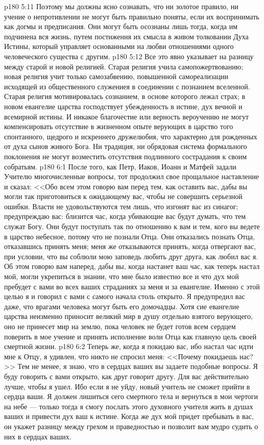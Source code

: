 \vs p180 5:11 Поэтому мы должны ясно сознавать, что ни золотое правило, ни учение о непротивлении не могут быть правильно поняты, если их воспринимать как догмы и предписания. Они могут быть осознаны лишь тогда, когда им подчинена вся жизнь, путем постижения их смысла в живом толковании Духа Истины, который управляет основанными на любви отношениями одного человеческого существа с другим.
\vs p180 5:12 Все это явно указывает на разницу между старой и новой религией. Старая религия учила самопожертвованию; новая религия учит только самозабвению, повышенной самореализации исходящей из общественного служениея в соединении с познанием вселенной. Старая религия мотивировалась сознанием, в основе которого лежал страх; в новом евангелие царства господствует убежденность в истине, дух вечной и всемирной истины. И никакое благочестие или верность вероучению не могут компенсировать отсутствие в жизненном опыте верующих в царство того спонтанного, щедрого и искреннего дружелюбия, что характерно для рожденных от духа сынов живого Бога. Ни традиция, ни обрядовая система формального поклонения не могут возместить отсутствия подлинного сострадания к своим собратьям.
\vs p180 6:1 После того, как Петр, Иаков, Иоанн и Матфей задали Учителю многочисленные вопросы, тот продолжил свое прощальное наставление и сказал: <<Обо всем этом говорю вам перед тем, как оставить вас, дабы вы могли так приготовиться к ожидающему вас, чтобы не совершить серьезной ошибки. Власти не удовольствуются тем лишь, что изгонят вас из синагог; предупреждаю вас: близится час, когда убивающие вас будут думать, что тем служат Богу. Они будут поступать так по отношению к вам и тем, кого вы ведете в царство небесное, потому что не познали Отца. Они отказались познать Отца, отказавшись принять меня; меня же отказываются принять, когда отвергают вас, при условии, что вы соблюли мою заповедь любить друг друга, как любил вас я. Об этом говорю вам наперед, дабы вы, когда настанет ваш час, как теперь настал мой, могли укрепиться в знании, что мне было известно все и что дух мой пребудет с вами во всех ваших страданиях за меня и за евангелие. Именно с этой целью я и говорил с вами с самого начала столь открыто. Я предупредил вас даже, что врагами человека могут быть его домочадцы. Хотя сие евангелие царства неизменно приносит великий мир в душу отдельно взятого верующего, оно не принесет мир на землю, пока человек не будет готов всем сердцем поверить в мое учение и принять исполнение воли Отца как главную цель своей смертной жизни.
\vs p180 6:2 Теперь же, когда я покидаю вас, ибо настал час идти мне к Отцу, я удивлен, что никто не спросил меня: <<Почему покидаешь нас?>> Тем не менее, я знаю, что в сердцах ваших вы задаете подобные вопросы. Я буду говорить с вами открыто, как друг говорит другу. Для вас действительно лучше, чтобы я ушел. Ибо если я не уйду, новый учитель не сможет прийти в сердца ваши. Я должен лишиться сего смертного тела и вернуться в мои чертоги на небе --- только тогда я смогу послать этого духовного учителя жить в душах ваших и привести дух ваш к истине. Когда же дух мой придет пребывать в вас, он укажет разницу между грехом и праведностью и позволит вам мудро судить о них в сердцах ваших.
